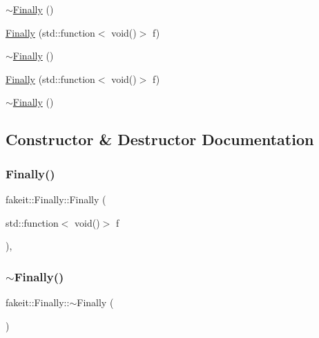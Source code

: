 \begin{DoxyCompactItemize}
\item 
\mbox{\hyperlink{classfakeit_1_1Finally_ac8854be9f73fc8d52334f0e71d6da413}{$\sim$\+Finally}} ()
\item 
\mbox{\hyperlink{classfakeit_1_1Finally_a7e9409bbdae549c8c36bf07d4161884c}{Finally}} (std\+::function$<$ void()$>$ f)
\item 
\mbox{\hyperlink{classfakeit_1_1Finally_ac8854be9f73fc8d52334f0e71d6da413}{$\sim$\+Finally}} ()
\item 
\mbox{\hyperlink{classfakeit_1_1Finally_a7e9409bbdae549c8c36bf07d4161884c}{Finally}} (std\+::function$<$ void()$>$ f)
\item 
\mbox{\hyperlink{classfakeit_1_1Finally_ac8854be9f73fc8d52334f0e71d6da413}{$\sim$\+Finally}} ()
\end{DoxyCompactItemize}


\subsection{Constructor \& Destructor Documentation}
\mbox{\label{classfakeit_1_1Finally_a7e9409bbdae549c8c36bf07d4161884c}} 
\subsubsection{\texorpdfstring{Finally()}{Finally()}\hspace{0.1cm}{\footnotesize\ttfamily [1/9]}}
{\footnotesize\ttfamily fakeit\+::\+Finally\+::\+Finally (\begin{DoxyParamCaption}\item[{std\+::function$<$ void()$>$}]{f }\end{DoxyParamCaption})\hspace{0.3cm}{\ttfamily [inline]}, {\ttfamily [explicit]}}

\mbox{\label{classfakeit_1_1Finally_ac8854be9f73fc8d52334f0e71d6da413}} 
\subsubsection{\texorpdfstring{$\sim$Finally()}{~Finally()}\hspace{0.1cm}{\footnotesize\ttfamily [1/9]}}
{\footnotesize\ttfamily fakeit\+::\+Finally\+::$\sim$\+Finally (\begin{DoxyParamCaption}{ }\end{DoxyParamCaption})\hspace{0.3cm}{\ttfamily [inline]}}

